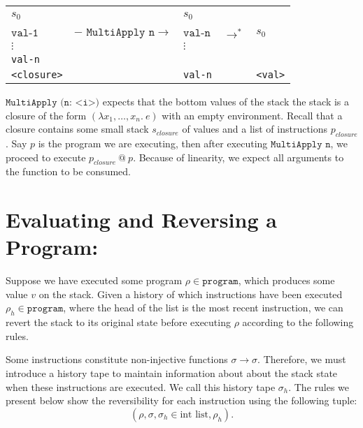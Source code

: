 \documentclass[11pt]{article}
\begin{document}
{\begin{center}
  \begin{tabular}{|P{2.5cm}|P{4cm}|P{2.5cm}|P{1cm}|P{2.5cm}|}
      
    &&&&\\ 
    $s_0$&&$s_0$&&\\
    &&&&\\  
      $\texttt{val-1}$&$- \texttt{  MultiApply n} \rightarrow$ &$\texttt{val-n}$& $\rightarrow^*$ & $s_0$\\  
      $\vdots$&&$\vdots$&&\\ 
    \texttt{val-n}&&&&\\ 
      \texttt{<closure>}&&\texttt{val-n}&& \texttt{<val>} \\
      
  \end{tabular}
\end{center}
$\texttt{MultiApply (n: <i>)}$ expects that the bottom values of the stack the stack is a closure of the form $(\lambda x_1, \dots, x_n.\ e)$ with an empty environment. Recall that a closure contains some small stack $s_{closure}$ of values and a list of instructions $p_{closure}$. Say $p$ is the program we are executing, then after executing $\texttt{MultiApply n}$, we proceed to execute $p_{closure}\ @\ p$. Because of linearity, we expect all arguments to the function to be
consumed.
}
\fi

\section*{Evaluating and Reversing a Program:}

Suppose we have executed some program $\rho \in \texttt{program}$, which produces some value $v$ on the stack. Given a history of which instructions have been executed $\rho_h \in \texttt{program}$, where the head of the list is the most recent instruction, we can revert the stack to its original state before executing $\rho$ according to the following rules.

Some instructions constitute non-injective functions $\sigma \rightarrow \sigma$. Therefore, we must introduce a history tape to maintain information about about the stack state when these instructions are executed. We call this history tape $\sigma_h$. The rules we present below show the reversibility for each instruction using the following tuple: $$(\rho, \sigma, \sigma_h \in \text{int list}, \rho_h).$$
\end{document}
